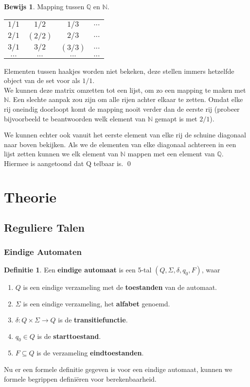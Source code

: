 \documentclass[12pt,a4paper]{article}
\theoremstyle{definition}
\newtheorem{defi}{Definitie}[section]
\newtheorem{bewijs}{Bewijs}[section]
\newcommand{\ra}{\ensuremath{\rightarrow}}
\begin{document}
	\begin{bewijs}
		Mapping tussen $\mathbb{Q}$ en $\mathbb{N}$.
		\begin{table}[H]
			\centering
			\begin{tabular}{|c|c|c|c|}
				\hline $1/1$ & $1/2$ & $1/3$ & $...$\\ 
				$2/1$ & $(2/2)$ & $2/3$ & $...$\\ 
				$3/1$ & $3/2$ & $(3/3)$ & $...$\\ 
				$...$ & $...$ & $...$ & $...$\\ 
				\hline 
			\end{tabular}
		\end{table}
		Elementen tussen haakjes worden niet bekeken, deze stellen immers hetzelfde object van de set voor als $1/1$. \\
		
		We kunnen deze matrix omzetten tot een lijst, om zo een mapping te maken met $\mathbb{N}$. Een slechte aanpak zou zijn om alle rijen achter elkaar te zetten. Omdat elke rij oneindig doorloopt komt de mapping nooit verder dan de eerste rij (probeer bijvoorbeeld te beantwoorden welk element van $\mathbb{N}$ gemapt is met $2/1$). 
		
		We kunnen echter ook vanuit het eerste element van elke rij de schuine diagonaal naar boven bekijken. Als we de elementen van elke diagonaal achtereen in een lijst zetten kunnen we elk element van $\mathbb{N}$ mappen met een element van $\mathbb{Q}$. Hiermee is aangetoond dat Q telbaar is. \qed
	\end{bewijs}
	
	
\newpage
\section{Theorie}
\subsection{Reguliere Talen}
\subsubsection{Eindige Automaten}
	\begin{defi}
		Een \textbf{eindige automaat} is een 5-tal $(Q,\Sigma,\delta,q_0,F)$, waar
		\begin{enumerate}
			\item $Q$ is een eindige verzameling met de \textbf{toestanden} van de automaat.
			\item $\Sigma$ is een eindige verzameling, het \textbf{alfabet} genoemd.
			\item $\delta: Q\times \Sigma \ra Q$ is de \textbf{transitiefunctie}.
			\item $q_0 \in Q$ is de \textbf{starttoestand}.
			\item $F \subseteq Q$ is de verzameling \textbf{eindtoestanden}.			
		\end{enumerate}
	\end{defi}
Nu er een formele definitie gegeven is voor een eindige automaat, kunnen we formele begrippen definiëren voor berekenbaarheid.\\
	
\end{document}
